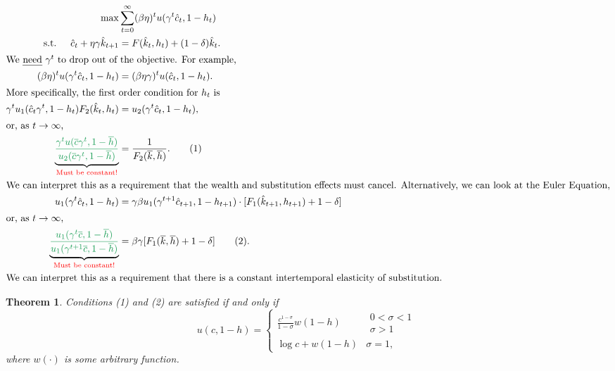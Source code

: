 \documentclass[11pt]{article}
\newtheorem*{theorem}{Theorem}
\newcommand{\gr}{\textcolor{ForestGreen}}
\newcommand{\rd}{\textcolor{red}}
\begin{document}
\begin{align*}
\max &\sum^\infty_{t = 0} (\beta \eta)^t u(\gamma^t \hat{c}_t, 1 - h_t)\\
\text{s.t. }\quad \hat{c}_t + \eta \gamma \hat{k}_{t + 1} &= F(\hat{k}_t, h_t) + (1 - \delta)\hat{k}_t.\\
\intertext{We \emph{need} $\gamma^t$ to drop out of the objective. For example,}
(\beta \eta)^t u(\gamma^t \hat{c}_t, 1 - h_t) &= (\beta \eta \gamma)^t u(\hat{c}_t, 1 - h_t).\\
\intertext{More specifically, the first order condition for $h_t$ is}
\gamma^t u_1(\hat{c}_t \gamma^t, 1 - h_t) F_2(\hat{k}_t, h_t) &= u_2(\gamma^t \hat{c}_t, 1 - h_t),\\
\intertext{or, as $t \to \infty$,}
\underbrace{\gr{\frac{\gamma^t u(\overline{c}\gamma^t, 1 - \overline{h})}{u_2(\overline{c}\gamma^t, 1 - \overline{h})}}}_{\text{\rd{Must be constant!}}} &= \frac{1}{F_2(\overline{k}, \overline{h})}.\tag{1}\\
\intertext{We can interpret this as a requirement that the wealth and substitution effects must cancel. Alternatively, we can look at the Euler Equation,}
 u_1(\gamma^t \hat{c}_t, 1 - h_t) &= \gamma \beta u_1(\gamma^{t + 1}\hat{c}_{t + 1}, 1 - h_{t + 1})\cdot [F_1(\hat{k}_{t + 1}, h_{t + 1}) + 1 - \delta]\\
\intertext{or, as $t \to \infty$,}
\underbrace{\gr{\frac{u_1(\gamma^t \overline{c}, 1 - \overline{h})}{u_1(\gamma^{t + 1}\overline{c}, 1 - \overline{h})}}}_{\text{\rd{Must be constant!}}} &= \beta \gamma [F_1(\overline{k}, \overline{h}) + 1 - \delta]\tag{2}.\\
\intertext{We can interpret this as a requirement that there is a constant intertemporal elasticity of substitution.}
\end{align*}

\begin{theorem}
Conditions (1) and (2) are satisfied if and only if
\[
u(c, 1 - h) = \left\{
\begin{array}{ll}
\frac{c^{1 - \sigma}}{1 - \sigma} w(1 - h) & \begin{array}{l} 0 < \sigma < 1 \\ \sigma > 1\end{array}\\
\log c + w(1 - h) & \sigma = 1, 
\end{array}
\right.
\]
where $w(\cdot)$ is some arbitrary function.
\end{theorem}
\end{document}
